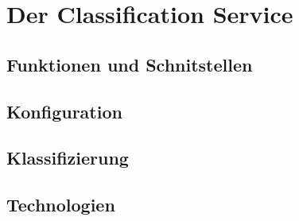\section{Der Classification Service}
    \label{section:solutionDetailsClassificationService}
    \subsection{Funktionen und Schnitstellen}
    \subsection{Konfiguration}
    \subsection{Klassifizierung}
        
    \subsection{Technologien}